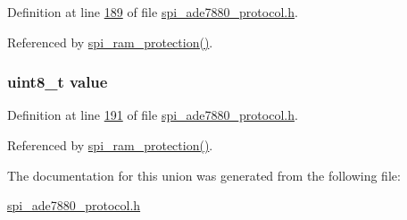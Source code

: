 Definition at line \hyperlink{a00041_source_l00189}{189} of file \hyperlink{a00041_source}{spi\-\_\-ade7880\-\_\-protocol.\-h}.



Referenced by \hyperlink{a00040_source_l00343}{spi\-\_\-ram\-\_\-protection()}.

\hypertarget{a00012_a638e4503e0ae6ce655b7ad2e17e8f0ad}{
\subsubsection[{value}]{\setlength{\rightskip}{0pt plus 5cm}uint8\-\_\-t value}}\label{df/d86/a00012_a638e4503e0ae6ce655b7ad2e17e8f0ad}


Definition at line \hyperlink{a00041_source_l00191}{191} of file \hyperlink{a00041_source}{spi\-\_\-ade7880\-\_\-protocol.\-h}.



Referenced by \hyperlink{a00040_source_l00343}{spi\-\_\-ram\-\_\-protection()}.



The documentation for this union was generated from the following file\-:\begin{DoxyCompactItemize}
\item 
\hyperlink{a00041}{spi\-\_\-ade7880\-\_\-protocol.\-h}\end{DoxyCompactItemize}
